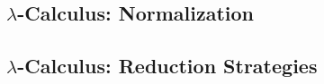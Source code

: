 \hSep



\hSep

\subsection*{\texorpdfstring{$\lambda$-Calculus: Normalization}{-Calculus: Normalization}}


\hSep

\subsection*{\texorpdfstring{$\lambda$-Calculus: Reduction Strategies}{-Calculus: Reduction Strategies}}






\hSep

